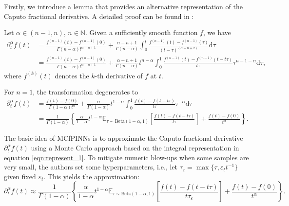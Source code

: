 \documentclass[preprint,3p,times]{elsarticle}
\def\al{\alpha}
\def\E{\mathbb{E}}
\def\al{\alpha}
\def\dta{\partial_t^\alpha}
\def\d{\mathrm{d}}
\begin{document}
Firstly, we introduce a lemma that provides an alternative representation of the Caputo fractional derivative. A detailed proof can be found in \cite[Lemma 2.10]{Jin2021:Book}:
\begin{lemma}
\label{lem:represent}
    Let $\al\in(n-1,n)$, $n\in\mathbb{N}$. Given a sufficiently smooth function $f$, we have 
    \begin{equation}
        \label{eqn:represent_any_al}
        \begin{aligned}
        \dta f(t) &= \frac{f^{(n-1)}(t)-f^{(n-1)}(0)}{\Gamma(n-\al)t^{\al-n+1}}+\frac{\al-n+1}{\Gamma(n-\al)}\int_0^t \frac{f^{(n-1)}(t)-f^{(n-1)}(\tau)}{(t-\tau)^{(\al-n+2)}}\d\tau\\
        & = \frac{f^{(n-1)}(t)-f^{(n-1)}(0)}{\Gamma(n-\al)t^{\al-n+1}}+\frac{\al-n+1}{\Gamma(n-\al)}t^{n-\al}\int_0^1 \frac{f^{(n-1)}(t)-f^{(n-1)}(t-t\tau)}{t\tau} \tau^{n-1-\al}\d\tau,
        \end{aligned}
    \end{equation}
    where $f^{(k)}(t)$ denotes the $k$-th derivative of $f$ at $t$.

    For $n=1$, the transformation degenerates to 
    \begin{equation}
        \label{eqn:represent_1}
        \begin{aligned}
        \dta f(t) &= \frac{f(t)-f(0)}{\Gamma(1-\al)t^{\al}}+\frac{\al}{\Gamma(1-\al)}t^{1-\al}\int_0^1 \frac{f(t)-f(t-t\tau)}{t\tau} \tau^{-\al}\d\tau\\
        &= \frac{1}{\Gamma(1-\al)}\left\{ \frac{\al}{1-\al}t^{1-\al} \E_{\tau\sim \text{Beta}(1-\al,1)}\left[\frac{f(t)-f(t-t\tau)}{t\tau}\right] +\frac{f(t)-f(0)}{t^\al}\right\}.
        \end{aligned}
    \end{equation}
\end{lemma}

The basic idea of MCfPINNs\cite{Guo2022:MCfPINN} is to approximate the Caputo fractional derivative $\dta f(t)$ using a Monte Carlo approach based on the integral representation in equation \eqref{eqn:represent_1}. To mitigate numeric blow-ups when some samples are very small, the authors set some hyperparameters, i.e., let $\tau_\varepsilon=\max\{\tau,\varepsilon_t t^{-1}\}$ given fixed $\varepsilon_t$. This yields the approximation: 
\begin{equation}
    \label{eqn:MCfd}
    \dta f(t) \approx \frac{1}{\Gamma(1-\al)}\left\{\frac{\al}{1-\al}t^{1-\al} \E_{\tau\sim \text{Beta}(1-\al,1)}\left[\frac{f(t)-f(t-t\tau)}{t\tau_\varepsilon}\right] +\frac{f(t)-f(0)}{t^\al}\right\}.
\end{equation}
\end{document}
